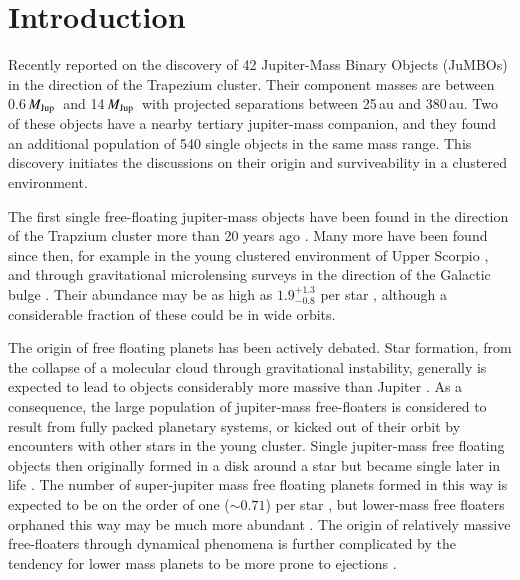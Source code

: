 \documentclass[aa]{lib/aa}
\newcommand{\MJup}{\mbox{${M}_{\rm Jup}$}}
\newcommand{\jumbos}{\mbox{JuMBOs}}
\begin{document}
   \maketitle
   
\section{Introduction}

Recently \cite{2023arXiv231001231P} reported on the discovery of 42
Jupiter-Mass Binary Objects (\jumbos) in the direction of the
Trapezium cluster.  Their component masses are between 0.6\,\MJup\,
and 14\,\MJup\, with projected separations between 25\,au and 380\,au.
Two of these objects have a nearby tertiary jupiter-mass companion,
and they found an additional population of 540 single objects in the
same mass range. This discovery initiates the discussions on their
origin and surviveability in a clustered environment.

The first single free-floating jupiter-mass objects have been found in
the direction of the Trapzium cluster more than 20 years ago
\cite{2000Sci...290..103Z,2000MNRAS.314..858L,2000AGM....17..A11M}.  Many more have been
found since then, for example in the young clustered environment of
Upper Scorpio \cite{2022NatAs...6...89M}, and through gravitational
microlensing surveys in the direction of the Galactic bulge
\cite{2011Natur.473..349S}.  Their abundance may be as high as
$1.9^{+1.3}_{-0.8}$ per star \cite{2011Natur.473..349S}, although a
considerable fraction of these could be in wide orbits.

The origin of free floating planets has been actively debated. Star
formation, from the collapse of a molecular cloud through
gravitational instability, generally is expected to lead to objects
considerably more massive than Jupiter
\citep{1976MNRAS.176..367L,2005A&A...430.1059B}.  As a consequence,
the large population of jupiter-mass free-floaters is considered to
result from fully packed planetary systems, or kicked out of their
orbit by encounters with other stars in the young cluster. Single
jupiter-mass free floating objects then originally formed in a disk
around a star but became single later in life
\cite{1996Sci...274..954R,2015MNRAS.453.2759Z,2002ApJ...565.1251H,2017MNRAS.470.4337C,
  2019MNRAS.489.2280F, 2019A&A...624A.120V}.  The number of
super-jupiter mass free floating planets formed in this way is
expected to be on the order of one ($\sim 0.71$) per star
\citep{2019A&A...624A.120V}, but lower-mass free floaters orphaned
this way may be much more abundant \cite{2002ApJ...565.1251H}.  The
origin of relatively massive free-floaters through dynamical phenomena
is further complicated by the tendency for lower mass planets to be
more prone to ejections
\citep{2001Icar..150..303F,2013MNRAS.433..867H,2019MNRAS.489.2280F,2020MNRAS.497.1807S}.
\end{document}
